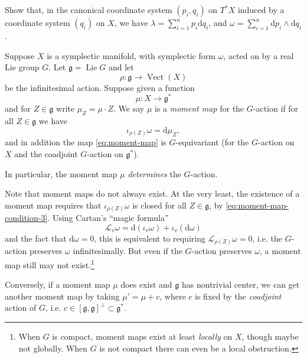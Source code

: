 \documentclass[12pt,letterpaper,reqno]{article}
\numberwithin{equation}{section}
\newcommand{\fg}{{\mathfrak g}}
\newcommand{\cL}{\ensuremath{\mathcal L}}
\newcommand{\de}{\mathrm{d}}
\newcommand{\ti}[1]{\textit{#1}}
\DeclareMathOperator{\Lie}{Lie}
\DeclareMathOperator{\Vect}{Vect}
\begin{document}
\begin{exercise}
Show that, in the canonical coordinate system $(p_i,q_i)$
on $T^* X$ induced by a coordinate system $(q_i)$ on $X$,
we have
$\lambda = \sum_{i=1}^n p_i \de q_i$, and
$\omega = \sum_{i=1}^n \de p_i \wedge \de q_i$.
\end{exercise}


\begin{defn} \label{def:moment-map}
Suppose $X$ is a symplectic manifold, with symplectic form $\omega$,
acted on by a real Lie group $G$. Let $\fg = \Lie G$ and let
\begin{equation}
\rho: \fg \to \Vect(X)
\end{equation}
be the infinitesimal action.
Suppose given a function
\begin{equation} \label{eq:moment-map}
 \mu: X \to \fg^*
\end{equation}
and for $Z \in \fg$ write $\mu_Z = \mu \cdot Z$.
We say $\mu$ is a \ti{moment map} for the $G$-action if
for all $Z \in \fg$ we have
\begin{equation} \label{eq:moment-map-condition-3}
  \iota_{\rho(Z)} \omega = \de \mu_Z,
\end{equation}
and in addition the map \eqref{eq:moment-map} is $G$-equivariant
(for the $G$-action on $X$ and the coadjoint $G$-action on $\fg^*$).
\end{defn}
In particular, the moment map $\mu$
\ti{determines} the $G$-action.

Note that moment maps do not always exist.
At the very least, the existence of a moment
map requires that $\iota_{\rho(Z)} \omega$ is closed
for all $Z \in \fg$, by \eqref{eq:moment-map-condition-3}. Using
Cartan's ``magic formula''
\begin{equation} \label{eq:cartan-magic-formula}
  \cL_v \omega = \de (\iota_v \omega) + \iota_v (\de \omega)
\end{equation}
and the fact that $\de \omega = 0$,
this is equivalent to requiring $\cL_{\rho(Z)}\omega = 0$,
i.e. the $G$-action preserves $\omega$ infinitesimally.
But even if the $G$-action preserves $\omega$,
a moment map still may not exist.\footnote{When $G$ is compact,
moment maps exist at least
\ti{locally} on $X$, though maybe not globally. When $G$ is not
compact there can even be a local obstruction.}

Conversely, if a moment map $\mu$ does exist and $\fg$
has nontrivial center, we can get another moment map by taking
$\mu' = \mu + c$, where $c$ is fixed by the \ti{coadjoint}
action of $G$, i.e. $c \in [\fg,\fg]^\perp \subset \fg^*$.
\end{document}
